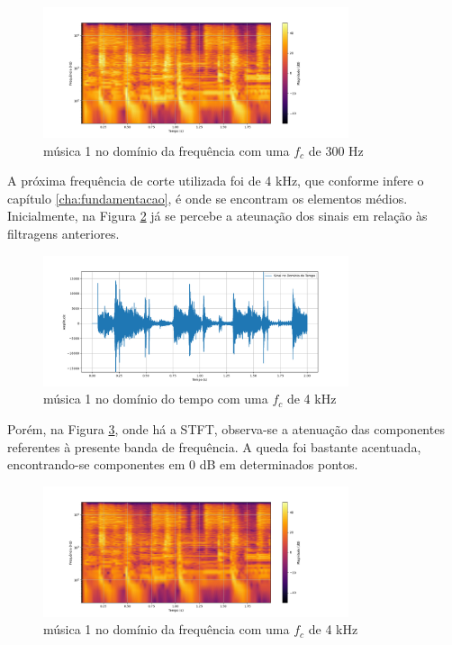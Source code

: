 \begin{figure}[h]
	\centering
    \includegraphics[width=0.8\textwidth]{figuras/fig29.png}
	\caption{música 1 no domínio da frequência com uma $f_c$ de 300 Hz}
	\label{fig29}
\end{figure}

A próxima frequência de corte utilizada foi de 4 kHz, que conforme infere o capítulo \ref{cha:fundamentacao}, é onde se encontram os elementos médios. Inicialmente, na Figura \ref{fig26} já se percebe a ateunação dos sinais em relação às filtragens anteriores.

\begin{figure}[h]
	\centering
    \includegraphics[width=0.8\textwidth]{figuras/fig26.png}
	\caption{música 1 no domínio do tempo com uma $f_c$ de 4 kHz}
	\label{fig26}
\end{figure}

Porém, na Figura \ref{fig27}, onde há a STFT, observa-se a atenuação das componentes referentes à presente banda de frequência. A queda foi bastante acentuada, encontrando-se componentes em 0 dB em determinados pontos.

\begin{figure}[h]
	\centering
    \includegraphics[width=0.8\textwidth]{figuras/fig27.png}
	\caption{música 1 no domínio da frequência com uma $f_c$ de 4 kHz}
	\label{fig27}
\end{figure}

